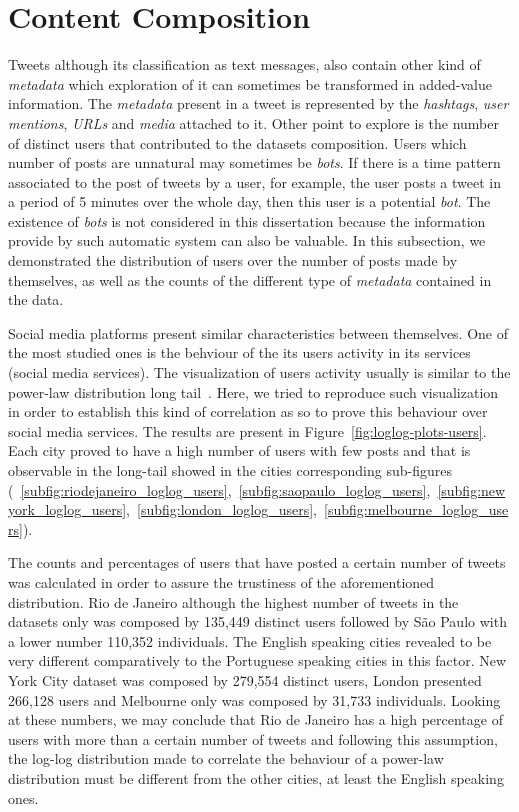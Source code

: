\section{Content Composition}

Tweets although its classification as text messages, also contain other kind of \textit{metadata} which exploration of it can sometimes be transformed in added-value information. The \textit{metadata} present in a tweet is represented by the \textit{hashtags}, \textit{user mentions}, \textit{URLs} and \textit{media} attached to it. Other point to explore is the number of distinct users that contributed to the datasets composition. Users which number of posts are unnatural may sometimes be \textit{bots}. If there is a time pattern associated to the post of tweets by a user, for example, the user posts a tweet in a period of 5 minutes over the whole day, then this user is a potential \textit{bot}. The existence of \textit{bots} is not considered in this dissertation because the information provide by such automatic system can also be valuable. In this subsection, we demonstrated the distribution of users over the number of posts made by themselves, as well as the counts of the different type of \textit{metadata }contained in the data. 

Social media platforms present similar characteristics between themselves. One of the most studied ones is the behviour of the its users activity in its services (social media services). The visualization of users activity usually is similar to the power-law distribution long tail~\cite{muchnik2013origins}. Here, we tried to reproduce such visualization in order to establish this kind of correlation as so to prove this behaviour over social media services. The results are present in Figure~\ref{fig:loglog-plots-users}. Each city proved to have a high number of users with few posts and that is observable in the long-tail showed in the cities corresponding sub-figures (~\ref{subfig:riodejaneiro_loglog_users},~\ref{subfig:saopaulo_loglog_users},~\ref{subfig:newyork_loglog_users},~\ref{subfig:london_loglog_users},~\ref{subfig:melbourne_loglog_users}).

The counts and percentages of users that have posted a certain number of tweets was calculated in order to assure the trustiness of the aforementioned distribution. Rio de Janeiro although the highest number of tweets in the datasets only was composed by 135,449 distinct users followed by São Paulo with a lower number 110,352 individuals. The English speaking cities revealed to be very different comparatively to the Portuguese speaking cities in this factor. New York City dataset was composed by 279,554 distinct users, London presented 266,128 users and Melbourne only was composed by 31,733 individuals. Looking at these numbers, we may conclude that Rio de Janeiro has a high percentage of users with more than a certain number of tweets and following this assumption, the log-log distribution made to correlate the behaviour of a power-law distribution must be different from the other cities, at least the English speaking ones.

